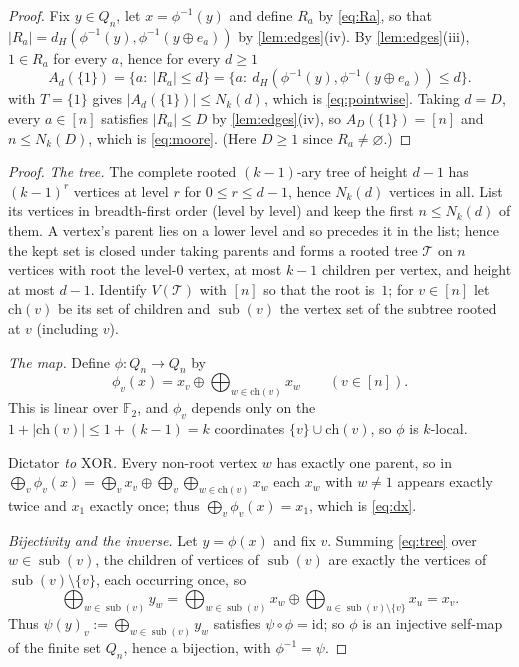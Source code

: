 \documentclass[11pt,a4paper]{article}
\theoremstyle{plain}
\theoremstyle{definition}
\theoremstyle{remark}
\newcommand{\dH}{d_H}
\newcommand{\Dict}{\mathrm{Dictator}}
\newcommand{\XOR}{\mathrm{XOR}}
\newcommand{\sub}{\operatorname{sub}}
\begin{document}
\label{pf:main}
\thmmain*
\begin{proof}
Fix $y\in Q_n$, let $x=\phi^{-1}(y)$ and define $R_a$ by \eqref{eq:Ra}, so that $|R_a|=\dH(\phi^{-1}(y),\phi^{-1}(y\oplus e_a))$ by \cref{lem:edges}(iv). By \cref{lem:edges}(iii), $1\in R_a$ for every $a$, hence for every $d\ge1$
\[
A_d(\{1\})=\{a:\ |R_a|\le d\}=\bigl\{a:\ \dH(\phi^{-1}(y),\phi^{-1}(y\oplus e_a))\le d\bigr\}.
\]
 with $T=\{1\}$ gives $|A_d(\{1\})|\le N_k(d)$, which is \eqref{eq:pointwise}. Taking $d=D$, every $a\in[n]$ satisfies $|R_a|\le D$ by \cref{lem:edges}(iv), so $A_D(\{1\})=[n]$ and $n\le N_k(D)$, which is \eqref{eq:moore}. (Here $D\ge1$ since $R_a\ne\varnothing$.)
\end{proof}

\label{pf:sharp}
\thmsharp*
\begin{proof}
\emph{The tree.} The complete rooted $(k-1)$-ary tree of height $d-1$ has $(k-1)^r$ vertices at level $r$ for $0\le r\le d-1$, hence $N_k(d)$ vertices in all. List its vertices in breadth-first order (level by level) and keep the first $n\le N_k(d)$ of them. A vertex's parent lies on a lower level and so precedes it in the list; hence the kept set is closed under taking parents and forms a rooted tree $\mathcal T$ on $n$ vertices with root the level-$0$ vertex, at most $k-1$ children per vertex, and height at most $d-1$. Identify $V(\mathcal T)$ with $[n]$ so that the root is~$1$; for $v\in[n]$ let $\mathrm{ch}(v)$ be its set of children and $\sub(v)$ the vertex set of the subtree rooted at $v$ (including $v$).

\emph{The map.} Define $\phi\colon Q_n\to Q_n$ by
\begin{equation}\label{eq:tree}
\phi_v(x)=x_v\oplus\bigoplus_{w\in\mathrm{ch}(v)}x_w\qquad(v\in[n]).
\end{equation}
This is linear over $\mathbb F_2$, and $\phi_v$ depends only on the $1+|\mathrm{ch}(v)|\le1+(k-1)=k$ coordinates $\{v\}\cup\mathrm{ch}(v)$, so $\phi$ is $k$-local.

\emph{$\Dict$ to $\XOR$.} Every non-root vertex $w$ has exactly one parent, so in $\bigoplus_v\phi_v(x)=\bigoplus_v x_v\oplus\bigoplus_v\bigoplus_{w\in\mathrm{ch}(v)}x_w$ each $x_w$ with $w\ne1$ appears exactly twice and $x_1$ exactly once; thus $\bigoplus_v\phi_v(x)=x_1$, which is \eqref{eq:dx}.

\emph{Bijectivity and the inverse.} Let $y=\phi(x)$ and fix $v$. Summing \eqref{eq:tree} over $w\in\sub(v)$, the children of vertices of $\sub(v)$ are exactly the vertices of $\sub(v)\setminus\{v\}$, each occurring once, so
\begin{equation}\label{eq:inv}
\bigoplus_{w\in\sub(v)}y_w=\bigoplus_{w\in\sub(v)}x_w\oplus\bigoplus_{u\in\sub(v)\setminus\{v\}}x_u=x_v .
\end{equation}
Thus $\psi(y)_v:=\bigoplus_{w\in\sub(v)}y_w$ satisfies $\psi\circ\phi=\mathrm{id}$; so $\phi$ is an injective self-map of the finite set $Q_n$, hence a bijection, with $\phi^{-1}=\psi$.


\end{proof}
\end{document}
